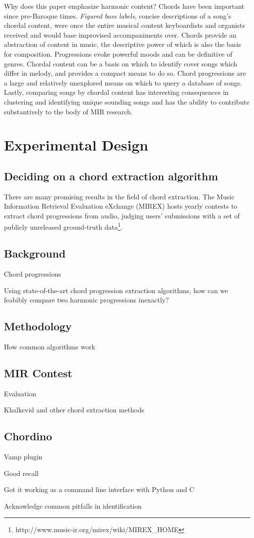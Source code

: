Why does this paper emphasize harmonic content? Chords have been important since pre-Baroque times. \textit{Figured bass labels}, concise descriptions of a song's chordal content, were once the entire musical content keyboardists and organists received and would base improvised accompaniments over. Chords provide an abstraction of content in music\cite{de2008tonal}, the descriptive power of which is also the basis for composition. Progressions evoke powerful moods and can be definitive of genres. Chordal content can be a basis on which to identify cover songs which differ in melody, and provides a compact means to do so\cite{khadkevich2013large}. Chord progressions are a large and relatively unexplored means on which to query a database of songs. Lastly, comparing songs by chordal content has interesting consequences in clustering and identifying unique sounding songs and has the ability to contribute substantively to the body of MIR research.

\section{Experimental Design}

\subsection{Deciding on a chord extraction algorithm}

There are many promising results in the field of chord extraction. The Music Information Retrieval Evaluation eXchange (MIREX) hosts yearly contests to extract chord progressions from audio, judging users' submissions with a set of publicly unreleased ground-truth data\footnote{http://www.music-ir.org/mirex/wiki/MIREX\_HOME}.

\subsection{Background}

Chord progressions

\item Using state-of-the-art chord progression extraction algorithms, how can we feabibly compare two harmonic progressions inexactly?

\subsection{Methodology}

\item How common algorithms work

\subsection{MIR Contest}

\item Evaluation
\item Khalkevid and other chord extraction methods

\subsection{Chordino}

\item Vamp plugin
\item Good recall
\item Got it working as a command line interface with Python and C
\item Acknowledge common pitfalls in identification